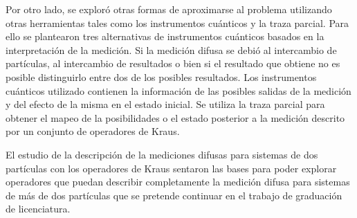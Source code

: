 Por otro lado, se exploró otras formas de aproximarse al problema utilizando otras herramientas tales como los instrumentos cuánticos y la traza parcial. Para ello se plantearon tres alternativas de instrumentos cuánticos basados en la interpretación de la medición. Si la medición difusa se debió al intercambio de partículas, al intercambio de resultados o bien si el resultado que obtiene no es posible distinguirlo entre dos de los posibles resultados. Los instrumentos cuánticos utilizado contienen la información de las posibles salidas de la medición  y del efecto de la misma en el estado inicial. Se utiliza la traza parcial para obtener el mapeo de la posibilidades o el estado posterior a la medición descrito por un conjunto de operadores de Kraus.

El estudio de la descripción de la mediciones difusas para sistemas de dos partículas con los operadores de Kraus sentaron las bases para poder explorar operadores que puedan describir completamente la medición difusa para sistemas de más de dos partículas que se pretende continuar en el trabajo de graduación de licenciatura.
